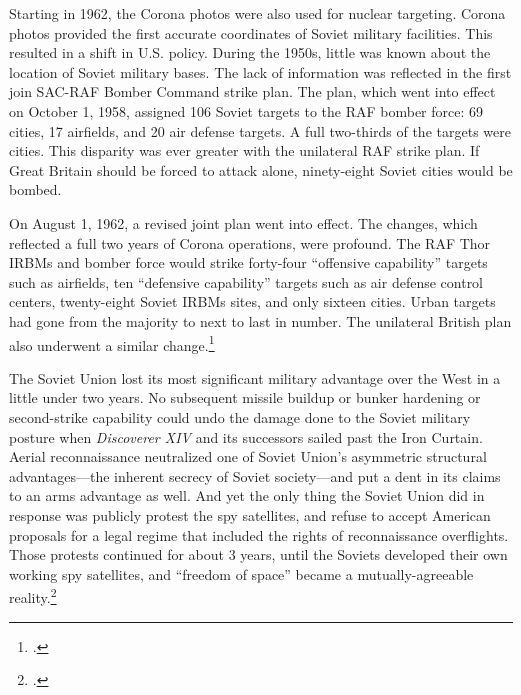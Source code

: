 \documentclass[14pt]{extarticle}
\begin{document}
\begin{quoteblock}
Starting in 1962, the Corona photos were also used for nuclear targeting. Corona photos provided the first accurate coordinates of Soviet military facilities. This resulted in a shift in U.S. policy. During the 1950s, little was known about the location of Soviet military bases. The lack of information was reflected in the first join SAC-RAF Bomber Command strike plan. The plan, which went into effect on October 1, 1958, assigned 106 Soviet targets to the RAF bomber force: 69 cities, 17 airfields, and 20 air defense targets. A full two-thirds of the targets were cities. This disparity was ever greater with the unilateral RAF strike plan. If Great Britain should be forced to attack alone, ninety-eight Soviet cities would be bombed.

On August 1, 1962, a revised joint plan went into effect. The changes, which reflected a full two years of Corona operations, were profound. The RAF Thor IRBMs and bomber force would strike forty-four ``offensive capability'' targets such as airfields, ten ``defensive capability'' targets such as air defense control centers, twenty-eight Soviet IRBMs sites, and only sixteen cities. Urban targets had gone from the majority to next to last in number. The unilateral British plan also underwent a similar change.\footcite[p.~139]{peebles_corona_1997}
\end{quoteblock}

The Soviet Union lost its most significant military advantage over the West in a little under two years. No subsequent missile buildup or bunker hardening or second-strike capability could undo the damage done to the Soviet military posture when \emph{Discoverer XIV} and its successors sailed past the Iron Curtain. Aerial reconnaissance neutralized one of Soviet Union's asymmetric structural advantages---the inherent secrecy of Soviet society---and put a dent in its claims to an arms advantage as well. And yet the only thing the Soviet Union did in response was publicly protest the spy satellites, and refuse to accept American proposals for a legal regime that included the rights of reconnaissance overflights. Those protests continued for about 3 years, until the Soviets developed their own working spy satellites, and ``freedom of space'' became a mutually-agreeable reality.\footcite[p.~271-275]{mcdougall_heavens_1985}
\end{document}

